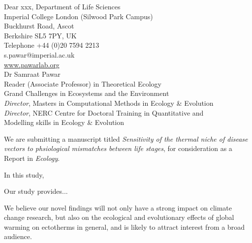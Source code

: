\documentclass[blank]{impletter}
\begin{document}
    
    { 
Dear xxx,    }
    {Department of Life Sciences\\
    Imperial College London (Silwood Park Campus)\\
    Buckhurst Road, Ascot\\
    Berkshire SL5 7PY, UK\\
    Telephone +44 (0)20 7594 2213\\
    s.pawar@imperial.ac.uk\\
    \url{www.pawarlab.org}\\
    }
    {
    Dr Samraat Pawar
    }
    {
    \\ Reader 
    (Associate Professor)
    in Theoretical Ecology
    \\
    Grand Challenges in Ecosystems and the Environment \\
    {\it Director}, Masters in Computational Methods in Ecology \& Evolution \\
    {\it Director}, NERC Centre for Doctoral Training in Quantitative  and \\ Modelling skills in Ecology \& Evolution 
    }
    \informal
    

We are submitting a manuscript titled {\it Sensitivity of the thermal niche of disease vectors to phsiological mismatches between life stages}, for consideration as a Report in {\it Ecology}. 


In this study, 

Our study provides... 

We believe our novel findings will not only have a strong impact on climate change research, but also on the ecological and evolutionary effects of global warming on ectotherms in general, and is likely to attract interest from a broad audience. 

\citep{Amarasekare2012a}
\end{document}
